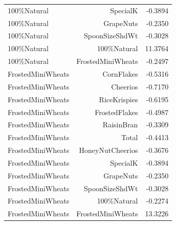 \begin{longtable}{@{}lrr@{}}
100\%Natural & SpecialK & -0.3894 \\
100\%Natural & GrapeNuts & -0.2350 \\
100\%Natural & SpoonSizeShdWt & -0.3028 \\
100\%Natural & 100\%Natural & 11.3764 \\
100\%Natural & FrostedMiniWheats & -0.2497 \\
FrostedMiniWheats & CornFlakes & -0.5316 \\
FrostedMiniWheats & Cheerios & -0.7170 \\
FrostedMiniWheats & RiceKrispies & -0.6195 \\
FrostedMiniWheats & FrostedFlakes & -0.4987 \\
FrostedMiniWheats & RaisinBran & -0.3309 \\
FrostedMiniWheats & Total & -0.4413 \\
FrostedMiniWheats & HoneyNutCheerios & -0.3676 \\
FrostedMiniWheats & SpecialK & -0.3894 \\
FrostedMiniWheats & GrapeNuts & -0.2350 \\
FrostedMiniWheats & SpoonSizeShdWt & -0.3028 \\
FrostedMiniWheats & 100\%Natural & -0.2274 \\
FrostedMiniWheats & FrostedMiniWheats & 13.3226 \\
\bottomrule
\end{longtable}
\endgroup